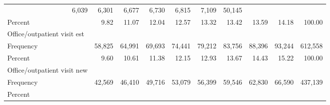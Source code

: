 \documentclass{article}
\begin{document}
\begin{table}[!h]
\begin{tabular}{llllllllll}
  \multicolumn{1}{r}{6,039} &
  \multicolumn{1}{r}{6,301} &
  \multicolumn{1}{r}{6,677} &
  \multicolumn{1}{r}{6,730} &
  \multicolumn{1}{r}{6,815} &
  \multicolumn{1}{r}{7,109} &
  \multicolumn{1}{r}{50,145} \\
\multicolumn{1}{l}{\hspace{2em}Percent} &
  \multicolumn{1}{|r}{9.82} &
  \multicolumn{1}{r}{11.07} &
  \multicolumn{1}{r}{12.04} &
  \multicolumn{1}{r}{12.57} &
  \multicolumn{1}{r}{13.32} &
  \multicolumn{1}{r}{13.42} &
  \multicolumn{1}{r}{13.59} &
  \multicolumn{1}{r}{14.18} &
  \multicolumn{1}{r}{100.00} \\
\multicolumn{1}{l}{\hspace{1em}Office/outpatient visit est} &
  \multicolumn{1}{|r}{} &
  \multicolumn{1}{r}{} &
  \multicolumn{1}{r}{} &
  \multicolumn{1}{r}{} &
  \multicolumn{1}{r}{} &
  \multicolumn{1}{r}{} &
  \multicolumn{1}{r}{} &
  \multicolumn{1}{r}{} &
  \multicolumn{1}{r}{} \\
\multicolumn{1}{l}{\hspace{2em}Frequency} &
  \multicolumn{1}{|r}{58,825} &
  \multicolumn{1}{r}{64,991} &
  \multicolumn{1}{r}{69,693} &
  \multicolumn{1}{r}{74,441} &
  \multicolumn{1}{r}{79,212} &
  \multicolumn{1}{r}{83,756} &
  \multicolumn{1}{r}{88,396} &
  \multicolumn{1}{r}{93,244} &
  \multicolumn{1}{r}{612,558} \\
\multicolumn{1}{l}{\hspace{2em}Percent} &
  \multicolumn{1}{|r}{9.60} &
  \multicolumn{1}{r}{10.61} &
  \multicolumn{1}{r}{11.38} &
  \multicolumn{1}{r}{12.15} &
  \multicolumn{1}{r}{12.93} &
  \multicolumn{1}{r}{13.67} &
  \multicolumn{1}{r}{14.43} &
  \multicolumn{1}{r}{15.22} &
  \multicolumn{1}{r}{100.00} \\
\multicolumn{1}{l}{\hspace{1em}Office/outpatient visit new} &
  \multicolumn{1}{|r}{} &
  \multicolumn{1}{r}{} &
  \multicolumn{1}{r}{} &
  \multicolumn{1}{r}{} &
  \multicolumn{1}{r}{} &
  \multicolumn{1}{r}{} &
  \multicolumn{1}{r}{} &
  \multicolumn{1}{r}{} &
  \multicolumn{1}{r}{} \\
\multicolumn{1}{l}{\hspace{2em}Frequency} &
  \multicolumn{1}{|r}{42,569} &
  \multicolumn{1}{r}{46,410} &
  \multicolumn{1}{r}{49,716} &
  \multicolumn{1}{r}{53,079} &
  \multicolumn{1}{r}{56,399} &
  \multicolumn{1}{r}{59,546} &
  \multicolumn{1}{r}{62,830} &
  \multicolumn{1}{r}{66,590} &
  \multicolumn{1}{r}{437,139} \\
\multicolumn{1}{l}{\hspace{2em}Percent} &

\end{tabular}
\end{table}
\end{document}
